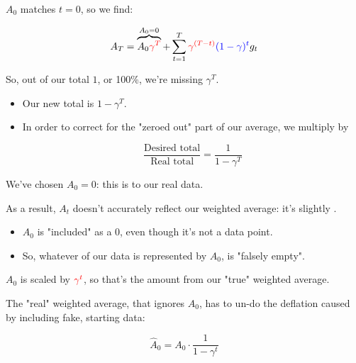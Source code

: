             $A_0$ matches $t=0$, so we find:

            \begin{equation}
                A_T = \overbrace{ A_0 \textcolor{red}{\gamma^T}}^{A_0=0} + 
                \sum_{t=1}^T \textcolor{red}{\gamma^{(T-t)}} \textcolor{blue}{(1-\gamma)^t} g_t
            \end{equation}

            So, out of our total $1$, or 100\%, we're missing $\gamma^T$.

            \begin{itemize}
                \item Our new total is $1-\gamma^T$.

                \item In order to correct for the "zeroed out" part of our average, we multiply by

                \begin{equation}
                    \frac{\text{Desired total}}{\text{Real total}}=\frac{1}{1-\gamma^T}
                \end{equation}
            \end{itemize}

            \begin{concept}
                We've chosen $A_0=0$: this is  to our real data. 
                
                As a result, $A_t$ doesn't accurately reflect our weighted average: it's slightly .

                \begin{itemize}
                    \item $A_0$ is "included" as a 0, even though it's not a  data point.
                    \item So, whatever  of our data is represented by $A_0$, is "falsely empty".
                \end{itemize}

                $A_0$ is scaled by $\textcolor{red}{\gamma^t}$, so that's the amount  from our "true" weighted average.

                The "real" weighted average, that ignores $A_0$, has to un-do the deflation caused by including fake, starting data:

                \begin{equation*}
                    \widehat{A}_0 = A_0 \cdot \frac{1}{1-\gamma^t}
                \end{equation*}
            \end{concept}

